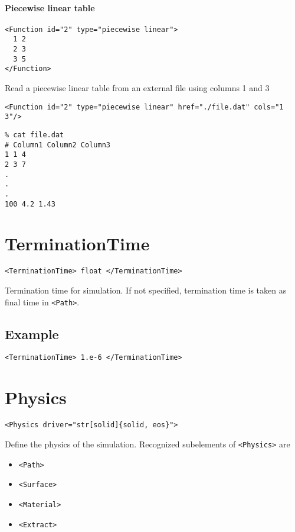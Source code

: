 \documentclass[11pt]{report}
\newcommand{\tag}[1]{\texttt{<#1>}}
\begin{document}
\paragraph{Piecewise linear table}
%
\begin{verbatim}
<Function id="2" type="piecewise linear">
  1 2
  2 3
  3 5
</Function>
\end{verbatim}
%
Read a piecewise linear table from an external file using columns 1 and 3
%
\begin{verbatim}
<Function id="2" type="piecewise linear" href="./file.dat" cols="1 3"/>
\end{verbatim}

\begin{verbatim}
% cat file.dat
# Column1 Column2 Column3
1 1 4
2 3 7
.
.
.
100 4.2 1.43
\end{verbatim}

\section{TerminationTime}
\begin{verbatim}
<TerminationTime> float </TerminationTime>
\end{verbatim}
%
Termination time for simulation.  If not specified, termination time is taken
as final time in \tag{Path}.

\subsection{Example}
\begin{verbatim}
<TerminationTime> 1.e-6 </TerminationTime>
\end{verbatim}

\section{Physics}
\begin{verbatim}
<Physics driver="str[solid]{solid, eos}">
\end{verbatim}
%
Define the physics of the simulation. Recognized subelements of \tag{Physics}
are
%
\begin{itemize}
  \item \tag{Path}
  \item \tag{Surface}
  \item \tag{Material}
  \item \tag{Extract}
\end{itemize}
\end{document}
